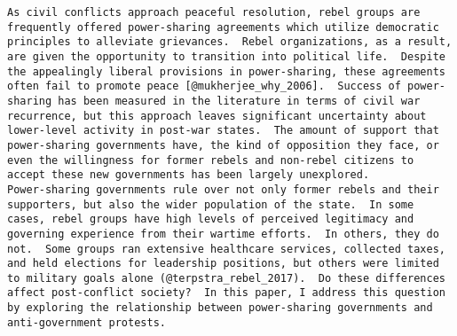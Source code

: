 \documentclass[11pt,]{article}
\begin{document}
\begin{verbatim}
As civil conflicts approach peaceful resolution, rebel groups are frequently offered power-sharing agreements which utilize democratic principles to alleviate grievances.  Rebel organizations, as a result, are given the opportunity to transition into political life.  Despite the appealingly liberal provisions in power-sharing, these agreements often fail to promote peace [@mukherjee_why_2006].  Success of power-sharing has been measured in the literature in terms of civil war recurrence, but this approach leaves significant uncertainty about lower-level activity in post-war states.  The amount of support that power-sharing governments have, the kind of opposition they face, or even the willingness for former rebels and non-rebel citizens to accept these new governments has been largely unexplored.  
Power-sharing governments rule over not only former rebels and their supporters, but also the wider population of the state.  In some cases, rebel groups have high levels of perceived legitimacy and governing experience from their wartime efforts.  In others, they do not.  Some groups ran extensive healthcare services, collected taxes, and held elections for leadership positions, but others were limited to military goals alone (@terpstra_rebel_2017).  Do these differences affect post-conflict society?  In this paper, I address this question by exploring the relationship between power-sharing governments and anti-government protests.  
\end{verbatim}
\end{document}
